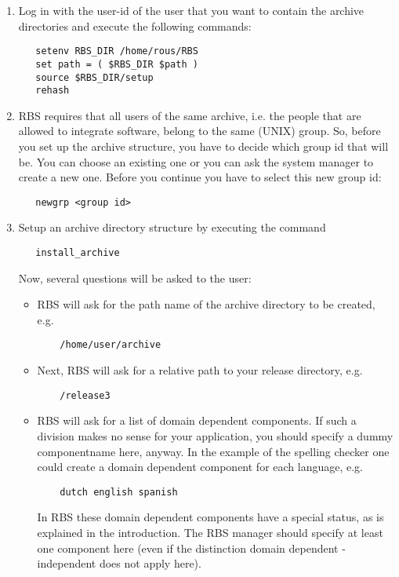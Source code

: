 \begin{enumerate}
\item Log in with the user-id of the user that you want to contain the archive
   directories and execute the following commands:
\begin{verbatim}   
   setenv RBS_DIR /home/rous/RBS
   set path = ( $RBS_DIR $path )
   source $RBS_DIR/setup
   rehash
\end{verbatim}
\item
RBS requires that all users of the same archive, i.e. the people that
   are allowed to integrate software, belong to the same (UNIX) group. 
   So, before you set up the archive structure, you have to decide which group
   id that will be. You can choose an existing one or you can ask the system
   manager to create a new one. Before you continue you have to select
   this new group id:
\begin{verbatim}
   newgrp <group id>
\end{verbatim}
\item Setup an archive directory structure by executing the command
\begin{verbatim}
   install_archive
\end{verbatim}
Now, several questions will be asked to the user:
\begin{itemize}
\item
RBS will ask for the path name of the archive directory to be created, e.g.
\begin{verbatim}
    /home/user/archive
\end{verbatim}  
\item Next, RBS will ask for a relative path to your release directory, e.g.
\begin{verbatim}
    /release3
\end{verbatim}  
\item RBS will ask for a list of domain dependent components. If such a division
    makes no sense for your application, you should specify a dummy 
    componentname here, anyway.
    In the example of the spelling checker one could create a domain dependent
    component for each language, e.g. 
\begin{verbatim}
    dutch english spanish
\end{verbatim}  
    In RBS these domain dependent components have a special status, as is
    explained in the introduction.
    The RBS manager should specify at least one component
    here (even if the distinction domain dependent - independent does not
    apply here).

\end{itemize}
\end{enumerate}
